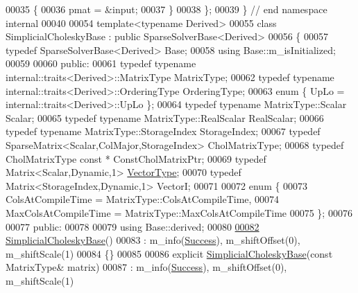 \begin{DoxyCode}
00035     \{
00036       pmat = &input;
00037     \}
00038   \};
00039 \} \textcolor{comment}{// end namespace internal}
00040 
00054 \textcolor{keyword}{template}<\textcolor{keyword}{typename} Derived>
00055 \textcolor{keyword}{class }SimplicialCholeskyBase : \textcolor{keyword}{public} SparseSolverBase<Derived>
00056 \{
00057     \textcolor{keyword}{typedef} SparseSolverBase<Derived> Base;
00058     \textcolor{keyword}{using} Base::m\_isInitialized;
00059     
00060   \textcolor{keyword}{public}:
00061     \textcolor{keyword}{typedef} \textcolor{keyword}{typename} internal::traits<Derived>::MatrixType MatrixType;
00062     \textcolor{keyword}{typedef} \textcolor{keyword}{typename} internal::traits<Derived>::OrderingType OrderingType;
00063     \textcolor{keyword}{enum} \{ UpLo = internal::traits<Derived>::UpLo \};
00064     \textcolor{keyword}{typedef} \textcolor{keyword}{typename} MatrixType::Scalar Scalar;
00065     \textcolor{keyword}{typedef} \textcolor{keyword}{typename} MatrixType::RealScalar RealScalar;
00066     \textcolor{keyword}{typedef} \textcolor{keyword}{typename} MatrixType::StorageIndex StorageIndex;
00067     \textcolor{keyword}{typedef} SparseMatrix<Scalar,ColMajor,StorageIndex> CholMatrixType;
00068     \textcolor{keyword}{typedef} CholMatrixType \textcolor{keyword}{const} * ConstCholMatrixPtr;
00069     \textcolor{keyword}{typedef} Matrix<Scalar,Dynamic,1> \hyperlink{struct_vector_type}{VectorType};
00070     \textcolor{keyword}{typedef} Matrix<StorageIndex,Dynamic,1> VectorI;
00071 
00072     \textcolor{keyword}{enum} \{
00073       ColsAtCompileTime = MatrixType::ColsAtCompileTime,
00074       MaxColsAtCompileTime = MatrixType::MaxColsAtCompileTime
00075     \};
00076 
00077   \textcolor{keyword}{public}:
00078     
00079     \textcolor{keyword}{using} Base::derived;
00080 
\hyperlink{group___sparse_cholesky___module_a098baba1dbe07ca3a775c8df1f8a0e71}{00082}     \hyperlink{group___sparse_cholesky___module_a098baba1dbe07ca3a775c8df1f8a0e71}{SimplicialCholeskyBase}()
00083       : m\_info(\hyperlink{group__enums_gga85fad7b87587764e5cf6b513a9e0ee5ea52581b035f4b59c203b8ff999ef5fcea}{Success}), m\_shiftOffset(0), m\_shiftScale(1)
00084     \{\}
00085 
00086     \textcolor{keyword}{explicit} \hyperlink{group___sparse_cholesky___module_class_eigen_1_1_simplicial_cholesky_base}{SimplicialCholeskyBase}(\textcolor{keyword}{const} MatrixType& matrix)
00087       : m\_info(\hyperlink{group__enums_gga85fad7b87587764e5cf6b513a9e0ee5ea52581b035f4b59c203b8ff999ef5fcea}{Success}), m\_shiftOffset(0), m\_shiftScale(1)

\end{DoxyCode}
